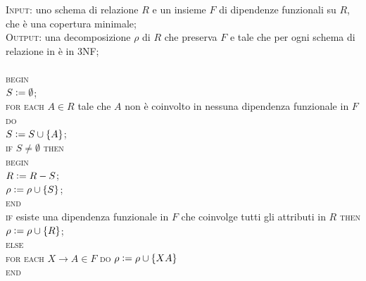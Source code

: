 \begin{alg}
 \textsc{Input}: uno schema di relazione $R$ e un insieme $F$ di dipendenze funzionali su $R$, che è una copertura
 minimale;\\
 \textsc{Output}: una decomposizione $\rho$ di $R$ che preserva $F$ e tale che per ogni schema di relazione in è 
 in 3NF;\\\\
 \textsc{begin}\\
 $S\vcentcolon= \emptyset$;\\
 \textsc{for each} $A \in R$ tale che $A$ non è coinvolto in nessuna dipendenza funzionale in $F$ \textsc{do}\\
 \indent $S\vcentcolon= S \cup \{A\}$;\\
 \textsc{if} $S \not= \emptyset$ \textsc{then}\\
\indent \textsc{begin}\\
\indent $R\vcentcolon= R-S$;\\
\indent $\rho\vcentcolon=\rho \cup \{S\}$;\\
\indent \textsc{end}\\
\textsc{if} esiste una dipendenza funzionale in $F$ che coinvolge tutti gli attributi in $R$ \textsc{then}\\
\indent $\rho\vcentcolon= \rho \cup \{R\}$;\\
\textsc{else}\\
\indent \textsc{for each} $X \rightarrow A \in F$ \textsc{do} $\rho\vcentcolon= \rho \cup \{XA\}$\\
\textsc{end}\\
\end{alg}

